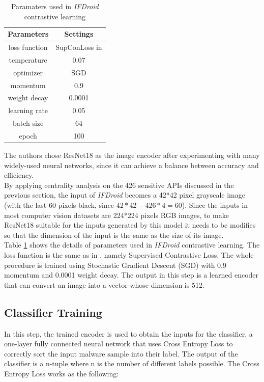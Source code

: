 \begin{table}[H]
    \centering
    \begin{tabular}{|c|c|}
        \hline
        Parameters & Settings \\
        \hline
        loss function & SupConLoss in \cite{khosla2020supervised} \\
        temperature & 0.07 \\
        optimizer & SGD \\
        momentum & 0.9 \\
        weight decay & 0.0001 \\
        learning rate & 0.05 \\
        batch size & 64 \\
        epoch & 100 \\
        \hline
    \end{tabular}
    \caption{Paramaters used in \textit{IFDroid} contrastive learning}
    \label{tab:IFDroidParam}
\end{table}

\noindent The authors chose ResNet18 \cite{he2016deep} as the image encoder after experimenting with many widely-used neural networks, since it can achieve a balance between accuracy and efficiency. \\
By applying centrality analysis on the 426 sensitive APIs discussed in the previous section, the input of \textit{IFDroid} becomes a 42*42 pixel grayscale image (with the last 60 pixels black, since $42*42-426*4=60$). Since the inputs in most computer vision datasets are 224*224 pixels RGB images, to make ResNet18 suitable for the inputs generated by this model it needs to be modifies so that the dimension of the input is the same
as the size of its image. \\
Table \ref{tab:IFDroidParam} shows the details of parameters used in \textit{IFDroid} contrastive learning. The loss function is the
same as in \cite{khosla2020supervised}, namely Supervised Contrastive Loss. The whole procedure is trained using Stochastic Gradient Descent (SGD) with 0.9 momentum and 0.0001 weight decay. The output in this step is a learned encoder that can convert an image into a vector whose dimension is 512.

\subsection{Classifier Training}

In this step, the trained encoder is used to obtain the inputs for the classifier, a one-layer fully connected neural network that uses Cross Entropy Loss to correctly sort the input malware sample into their label. The output of the classifier is a n-tuple where n is the number of different labels possible. The Cross Entropy Loss works as the following:

